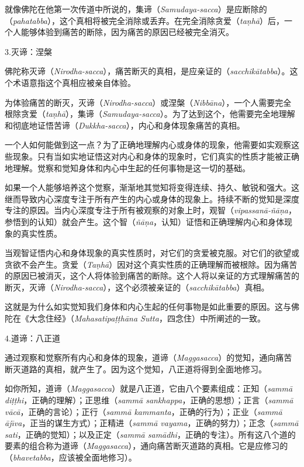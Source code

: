 就像佛陀在他第一次传道中所说的，集谛（{\it Samudaya-sacca}）是应断除的（{\it pahatabba}），这个真相将被完全消除或丢弃。在完全消除贪爱（{\it ta\d nh\=a}）后，一个人能够体验到痛苦的断除，因为痛苦的原因已经被完全消灭。

\sssubsectnon 3.灭谛：涅槃

佛陀称灭谛（{\it Nirodha-sacca}），痛苦断灭的真相，是应亲证的（{\it sacchik\=atabba}）。这个术语意指这个真相应被亲自体验。

为体验痛苦的断灭，灭谛（{\it Nirodha-sacca}）或涅槃（{\it Nibb\=ana}），一个人需要完全根除贪爱（{\it ta\d nh\=a}），集谛（{\it Samudaya-sacca}）。为了达到这个，他需要完全地理解和彻底地证悟苦谛（{\it Dukkha-sacca}），内心和身体现象痛苦的真相。

一个人如何能做到这一点？为了正确地理解内心或身体的现象，他需要如实观察这些现象。只有当如实地证悟这对内心和身体的现象时，它们真实的性质才能被正确地理解。觉察和觉知身体和内心中生起的任何事物是这一切的基础。

如果一个人能够培养这个觉察，渐渐地\1其觉知将变得连续、持久、敏锐和强大。这继而导致内心深度专注于所有产生的内心或身体的现象上。持续不断的觉知是深度专注的原因。当内心深度专注于所有被观察的对象上时，观智（{\it vipassan\=a-\~n\=a\d na}，参悟到的认知）就会产生。这个智（{\it \~n\=a\d na}，认知）证悟和正确理解内心和身体现象的真实性质。

当观智证悟内心和身体现象的真实性质时，对它们的贪爱被克服。对它们的欲望或贪欲不会产生。贪爱（{\it Ta\d nh\=a}）因对这个真实性质的正确理解而被根除。因为痛苦的原因已被消灭，这个人将体验到痛苦的断除。这个人将以亲证的方式理解痛苦的断灭，灭谛（{\it Nirodha-sacca}），这个必须被亲证的（{\it sacchik\=atabba}）真相。

这就是为什么如实觉知我们身体和内心生起的任何事物是如此重要的原因。这与佛陀在《大念住经》（{\it Mahasatipa\d t\d th\=ana Sutta}，四念住）中所阐述的一致。

\sssubsectnon 4.道谛：八正道

通过观察和觉察所有内心和身体的现象，道谛（{\it Maggasacca}）的觉知，通向痛苦断灭道路的真相，就产生了。因为这个觉知，八正道将得到全面地修习。

如你所知，道谛（{\it Maggasacca}）就是八正道，它由八个要素组成：\1正知（{\it samm\=a di\d t\d thi}，正确的理解）；正思维（{\it samm\=a sankhappa}，正确的思想）；正言（{\it samm\=a v\=ac\=a}，正确的言论）；正行（{\it samm\=a kammanta}，正确的行为）；正业（{\it samm\=a \=aj\=\i va}，正当的谋生方式）；正精进（{\it samm\=a vayama}，正确的努力）；正念（{\it samm\=a sati}，正确的觉知）；以及正定（{\it samm\=a sam\=adhi}，正确的专注）。所有这八个道的要素的组合称为道谛（{\it Maggasacca}），通向痛苦断灭道路的真相。它是应修习的（{\it bhavetabba}，应该被全面地修习）。

